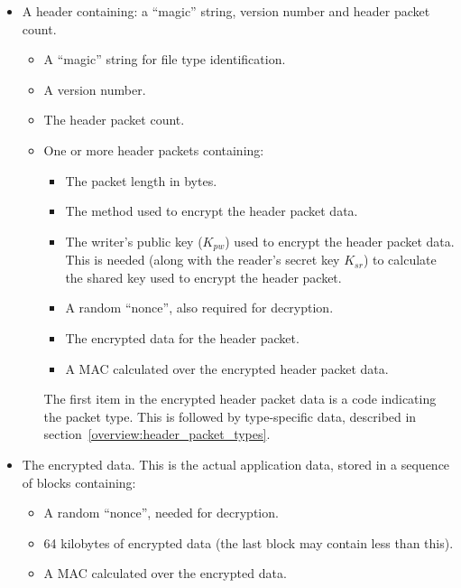 \documentclass[10pt]{article}
\begin{document}
\begin{itemize}
\item A header containing: a ``magic'' string, version number and header packet count.
\begin{itemize}
\item A ``magic'' string for file type identification.
\item A version number.
\item The header packet count.
\item One or more header packets containing:
\begin{itemize}
\item The packet length in bytes.
\item The method used to encrypt the header packet data.
\item The writer's public key  ($K_{pw}$) used to encrypt the header packet data.
This is needed (along with the reader's secret key $K_{sr}$)
to calculate the shared key used to encrypt the header packet.
\item A random ``nonce'', also required for decryption.
\item The encrypted data for the header packet.
\item A MAC calculated over the encrypted header packet data.
\end{itemize}
The first item in the encrypted header packet data is a code indicating the packet type.
This is followed by type-specific data, described in section~\ref{overview:header_packet_types}.
\end{itemize}
\item The encrypted data.
This is the actual application data, stored in a sequence of blocks containing:
\begin{itemize}
\item A random ``nonce'', needed for decryption.
\item 64 kilobytes of encrypted data (the last block may contain less than this).
\item A MAC calculated over the encrypted data.
\end{itemize}
\end{itemize}
\end{document}
